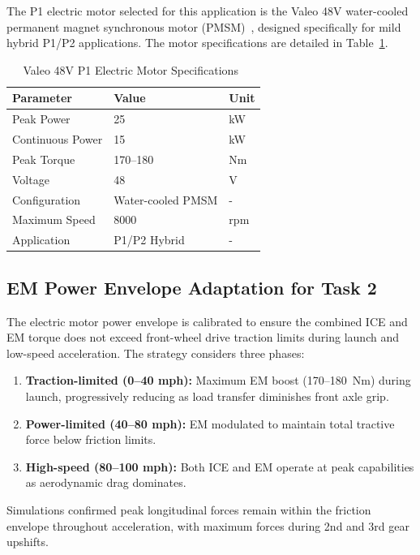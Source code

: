 The P1 electric motor selected for this application is the Valeo 48V water-cooled permanent magnet synchronous motor (PMSM)~\cite{valeo_48v_motor}, designed specifically for mild hybrid P1/P2 applications. The motor specifications are detailed in Table~\ref{tab:em_specs}.

\begin{table}[H]
\centering
\caption{Valeo 48V P1 Electric Motor Specifications~\cite{valeo_48v_motor}}
\label{tab:em_specs}
\small
\begin{tabular}{@{}lll@{}}
\toprule
\textbf{Parameter} & \textbf{Value} & \textbf{Unit} \\
\midrule
Peak Power & 25 & kW \\
Continuous Power & 15 & kW \\
Peak Torque & 170--180 & Nm \\
Voltage & 48 & V \\
Configuration & Water-cooled PMSM & - \\
Maximum Speed & 8000 & rpm \\
Application & P1/P2 Hybrid & - \\
\bottomrule
\end{tabular}
\end{table}

\subsection{EM Power Envelope Adaptation for Task 2}

The electric motor power envelope is calibrated to ensure the combined ICE and EM torque does not exceed front-wheel drive traction limits during launch and low-speed acceleration. The strategy considers three phases:

\begin{enumerate}
    \item \textbf{Traction-limited (0--40 mph):} Maximum EM boost (170--180~Nm) during launch, progressively reducing as load transfer diminishes front axle grip.
    \item \textbf{Power-limited (40--80 mph):} EM modulated to maintain total tractive force below friction limits.
    \item \textbf{High-speed (80--100 mph):} Both ICE and EM operate at peak capabilities as aerodynamic drag dominates.
\end{enumerate}

Simulations confirmed peak longitudinal forces remain within the friction envelope throughout acceleration, with maximum forces during 2nd and 3rd gear upshifts.

